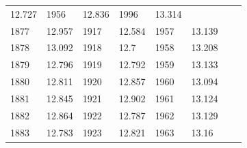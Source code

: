 \begin{description}[noitemsep]
\begin{description}[noitemsep]
\begin{table}[H]
\begin{center}
\begin{xtabular}[t]{|l|l|l|l|l|l|l|l|}
        	12.727	 &
        	1956	 &
        	12.836	 &
        	1996	 &
        	13.314	%
     \tabularnewline{}
        	1877	 &
        	12.957	 &
        	1917	 &
        	12.584	 &
        	1957	 &
        	13.139	 &
        		 &
     \tabularnewline{}
        	1878	 &
        	13.092	 &
        	1918	 &
        	12.7	 &
        	1958	 &
        	13.208	 &
        		 &
     \tabularnewline{}
        	1879	 &
        	12.796	 &
        	1919	 &
        	12.792	 &
        	1959	 &
        	13.133	 &
        		 &
     \tabularnewline{}
        	1880	 &
        	12.811	 &
        	1920	 &
        	12.857	 &
        	1960	 &
        	13.094	 &
        		 &
     \tabularnewline{}
        	1881	 &
        	12.845	 &
        	1921	 &
        	12.902	 &
        	1961	 &
        	13.124	 &
        		 &
     \tabularnewline{}
        	1882	 &
        	12.864	 &
        	1922	 &
        	12.787	 &
        	1962	 &
        	13.129	 &
        		 &
     \tabularnewline{}
        	1883	 &
        	12.783	 &
        	1923	 &
        	12.821	 &
        	1963	 &
        	13.16	 &
        		 &
     \tabularnewline{}

\end{xtabular}
\end{center}
\end{table}
\end{description}
\end{description}
